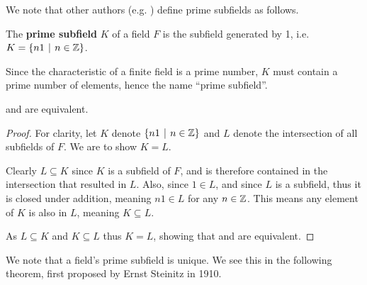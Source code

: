 We note that other authors (e.g. \cite[p.~511]{dummit_foote_2004}) define prime subfields as follows.

\begin{definition}\label{definition-prime-subfield-alt}
    The \textbf{prime subfield} $K$ of a field $F$ is the subfield generated by 1, i.e. $K = \{n1 \vert n \in \Z\}$.
\end{definition}
\begin{remark}
    Since the characteristic of a finite field is a prime number, $K$ must contain a prime number of elements, hence the name ``prime subfield''.
\end{remark}
\begin{theorem}
     and  are equivalent.
\end{theorem}
\begin{proof}
    For clarity, let $K$ denote $\{n1 \vert n \in \Z\}$ and $L$ denote the intersection of all subfields of $F$. We are to show $K = L$.

    Clearly $L \subseteq K$ since $K$ is a subfield of $F$, and is therefore contained in the intersection that resulted in $L$. Also, since $1 \in L$, and since $L$ is a subfield, thus it is closed under addition, meaning $n1 \in L$ for any $n \in \mathbb{Z}$. This means any element of $K$ is also in $L$, meaning $K \subseteq L$.

    As $L \subseteq K$ and $K \subseteq L$ thus $K = L$, showing that  and  are equivalent.
\end{proof}

\newpage

We note that a field's prime subfield is unique. We see this in the following theorem, first proposed by Ernst Steinitz in 1910.

